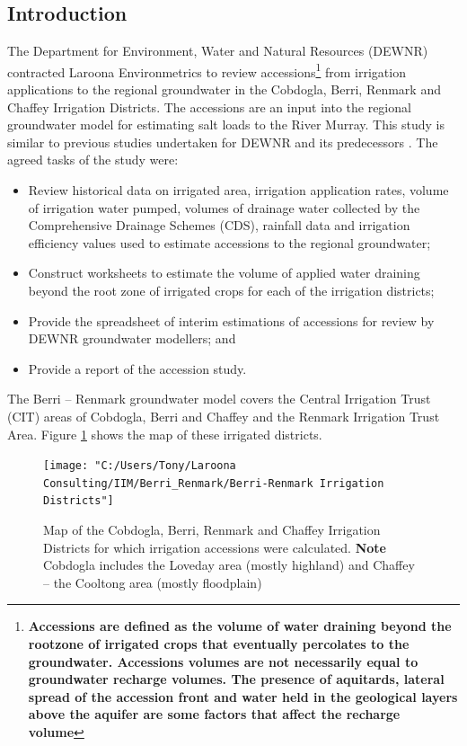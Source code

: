 \documentclass[a4paper, titlepage, 12pt]{article}\usepackage[]{graphicx}\usepackage[]{color}
\begin{document}
\begin{sffamily}
\section{Introduction}
The Department for Environment, Water and Natural Resources (DEWNR) contracted Laroona Environmetrics to review accessions\footnote{\footnotesize{\bfseries{Accessions} are defined as the volume of water draining beyond the rootzone of irrigated crops that eventually percolates to the groundwater. Accessions volumes are not necessarily equal to groundwater recharge volumes. The presence of aquitards, lateral spread of the accession front and water held in the geological layers above the aquifer are some factors that affect the recharge volume}} from irrigation applications to the regional groundwater in the Cobdogla, Berri, Renmark and Chaffey Irrigation Districts. The accessions are an input into the regional groundwater model for estimating salt loads to the River Murray. This study is similar to previous  studies undertaken for DEWNR and its predecessors \citep{Meissner2014, Meissner2012, Meissner2011a, Meissner2011b}. The agreed tasks of the study were:

\begin{itemize}
  \item Review historical data on irrigated area, irrigation application rates, volume of irrigation water pumped, volumes of drainage water collected by the Comprehensive Drainage Schemes (CDS), rainfall data and irrigation efficiency values used to estimate accessions to the regional groundwater;
  \item  Construct worksheets to estimate the volume of applied water draining beyond the root zone of irrigated crops for each of the irrigation districts;
  \item Provide the spreadsheet of interim estimations of accessions for review by DEWNR groundwater modellers; and
  \item Provide a report of the accession study.
\end{itemize}

The Berri -- Renmark groundwater model covers the Central Irrigation Trust (CIT) areas of Cobdogla,  Berri and Chaffey and the Renmark Irrigation Trust Area.  Figure \ref{fig01} shows the map of these irrigated districts.

\begin{figure}
\texttt{[image: "C:/Users/Tony/Laroona Consulting/IIM/Berri\_Renmark/Berri-Renmark Irrigation Districts"]}
\label{fig01}
\caption{Map of the Cobdogla, Berri, Renmark and Chaffey Irrigation Districts for which irrigation accessions were calculated. \textbf{Note} Cobdogla includes the Loveday area (mostly highland) and Chaffey -- the Cooltong area (mostly floodplain)}
\end{figure}


\end{sffamily}
\end{document}
